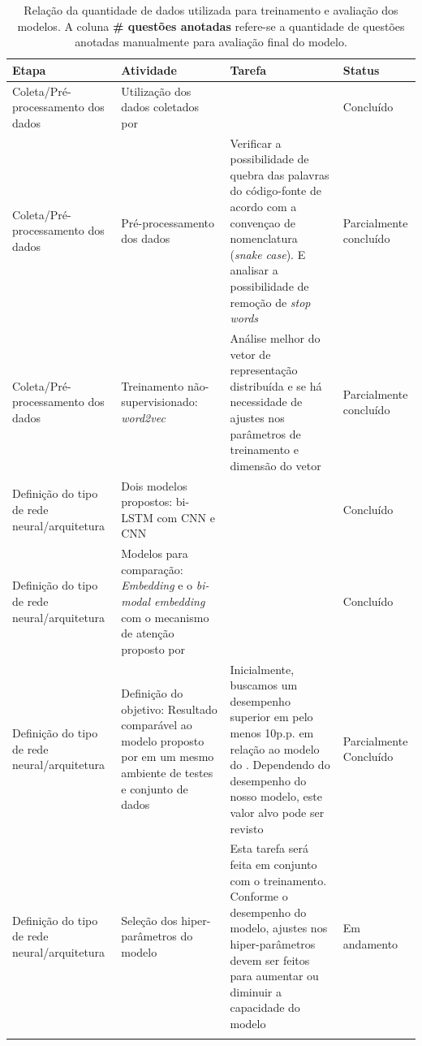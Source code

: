 \begin{longtable}{ p{10em} p{10em} p{10em} p{6em} }
\hline
\textbf{Etapa} & \textbf{Atividade} & \textbf{Tarefa} & \textbf{Status} \\
\hline
Coleta/Pré-processamento dos dados & Utilização dos dados coletados por \cite{yao-2018} & & Concluído  \\
\hline

Coleta/Pré-processamento dos dados & Pré-processamento dos dados & Verificar a possibilidade de quebra das palavras do código-fonte de acordo com a convençao de nomenclatura (\textit{snake case}). E analisar a possibilidade de remoção de \textit{stop words} & Parcialmente concluído  \\
\hline

Coleta/Pré-processamento dos dados & Treinamento não-supervisionado: \textit{word2vec} & Análise melhor do vetor de representação distribuída e se há necessidade de ajustes nos parâmetros de treinamento e dimensão do vetor & Parcialmente concluído  \\
\hline

Definição do tipo de rede neural/arquitetura & Dois modelos propostos: bi-LSTM com CNN e CNN & & Concluído  \\
\hline

Definição do tipo de rede neural/arquitetura & Modelos para comparação: \textit{Embedding} e o \textit{bi-modal embedding} com o mecanismo de atenção proposto por \cite{cambronero-deep-learning-code-search:2019} & & Concluído  \\
\hline

Definição do tipo de rede neural/arquitetura & Definição do objetivo: Resultado comparável ao modelo proposto por \cite{cambronero-deep-learning-code-search:2019} em um mesmo ambiente de testes e conjunto de dados & Inicialmente, buscamos um desempenho superior em pelo menos 10p.p. em relação ao modelo do \cite{cambronero-deep-learning-code-search:2019}. Dependendo do desempenho do nosso modelo, este valor alvo pode ser revisto & Parcialmente Concluído  \\
\hline

Definição do tipo de rede neural/arquitetura & Seleção dos hiper-parâmetros do modelo & Esta tarefa será feita em conjunto com o treinamento. Conforme o desempenho do modelo, ajustes nos hiper-parâmetros devem ser feitos para aumentar ou diminuir a capacidade do modelo & Em andamento  \\
\hline

 
\caption{Relação da quantidade de dados utilizada para treinamento e avaliação dos modelos. A coluna \textbf{\# questões anotadas} refere-se a quantidade de questões anotadas manualmente para avaliação final do modelo.}
\label{table:etapas-processo-treinamento}
\end{longtable}


